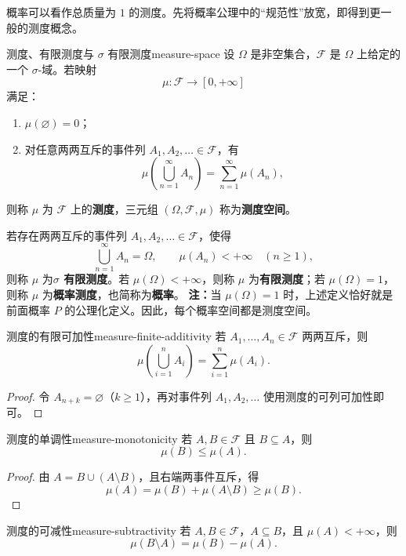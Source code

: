 概率可以看作总质量为 $1$ 的测度。先将概率公理中的“规范性”放宽，即得到更一般的测度概念。

\begin{mydefinition}{测度、有限测度与 $\sigma$ 有限测度}{measure-space}
设 $\Omega$ 是非空集合，$\mathscr{F}$ 是 $\Omega$ 上给定的一个 $\sigma$-域。若映射
\[
\mu:\mathscr{F}\longrightarrow[0,+\infty]
\]
满足：
\begin{enumerate}
\item $\mu(\varnothing)=0$；
\item 对任意两两互斥的事件列 $A_1,A_2,\ldots\in\mathscr{F}$，有
\[
\mu\left(\bigcup_{n=1}^{\infty}A_n\right)
=\sum_{n=1}^{\infty}\mu(A_n),
\]
\end{enumerate}
则称 $\mu$ 为 $\mathscr{F}$ 上的\textbf{测度}，三元组 $(\Omega,\mathscr{F},\mu)$ 称为\textbf{测度空间}。

\end{mydefinition}
若存在两两互斥的事件列 $A_1,A_2,\ldots\in\mathscr{F}$，使得
\[
\bigcup_{n=1}^{\infty}A_n=\Omega,
\qquad
\mu(A_n)<+\infty\quad(n\geq1),
\]
则称 $\mu$ 为\textbf{$\sigma$ 有限测度}。若 $\mu(\Omega)<+\infty$，则称 $\mu$ 为\textbf{有限测度}；若 $\mu(\Omega)=1$，则称 $\mu$ 为\textbf{概率测度}，也简称为\textbf{概率}。
\textbf{注：}当 $\mu(\Omega)=1$ 时，上述定义恰好就是前面概率 $P$ 的公理化定义。因此，每个概率空间都是测度空间。

\begin{proposition}{测度的有限可加性}{measure-finite-additivity}
若 $A_1,\ldots,A_n\in\mathscr{F}$ 两两互斥，则
\[
\mu\left(\bigcup_{i=1}^{n}A_i\right)=\sum_{i=1}^{n}\mu(A_i).
\]
\end{proposition}

\begin{proof}
令 $A_{n+k}=\varnothing$（$k\geq1$），再对事件列 $A_1,A_2,\ldots$ 使用测度的可列可加性即可。
\end{proof}

\begin{proposition}{测度的单调性}{measure-monotonicity}
若 $A,B\in\mathscr{F}$ 且 $B\subseteq A$，则
\[
\mu(B)\leq\mu(A).
\]
\end{proposition}

\begin{proof}
由 $A=B\cup(A\setminus B)$，且右端两事件互斥，得
\[
\mu(A)=\mu(B)+\mu(A\setminus B)\geq\mu(B).
\]
\end{proof}

\begin{proposition}{测度的可减性}{measure-subtractivity}
若 $A,B\in\mathscr{F}$，$A\subseteq B$，且 $\mu(A)<+\infty$，则
\[
\mu(B\setminus A)=\mu(B)-\mu(A).
\]
\end{proposition}

